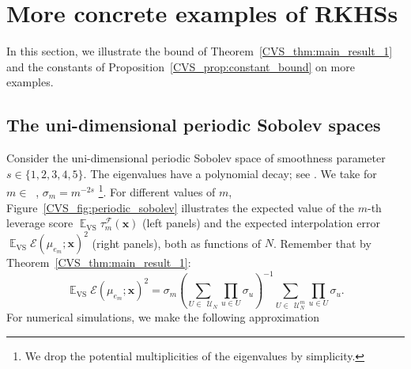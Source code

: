 \documentclass[twoside,11pt]{book}
\numberwithin{theorem}{chapter}
\numberwithin{definition}{chapter}
\numberwithin{proposition}{chapter}
\numberwithin{corollary}{chapter}
\numberwithin{example}{chapter}
\numberwithin{lemma}{chapter}
\numberwithin{assumption}{chapter}
\numberwithin{equation}{chapter}
\numberwithin{figure}{chapter}
\DeclareMathOperator{\VS}{\mathrm{VS}}
\DeclareMathOperator{\EX}{\mathbb{E}}
\DeclareMathOperator{\F}{\mathcal{F}}
\DeclareMathOperator{\X}{\mathcal{X}}
\DeclareMathOperator{\Ns}{\mathbb{N}^{*}}
\def\UN{\:\mathcal{U}_N}
\def\UNm{\:\mathcal{U}_N^m}
\begin{document}
%
\section{More concrete examples of RKHSs}
In this section, we illustrate the bound of Theorem~\ref{CVS_thm:main_result_1} and the constants of Proposition~\ref{CVS_prop:constant_bound} on more examples.
\subsection{The uni-dimensional periodic Sobolev spaces}

Consider the uni-dimensional periodic Sobolev space of smoothness parameter $s \in \{1,2,3,4,5\}$.
The eigenvalues have a polynomial decay; see \citep{Wah90}. We take for $m \in \Ns$, $\sigma_{m}=m^{-2s}$ \footnote{We drop the potential multiplicities of the eigenvalues by simplicity.}.
For different values of $m$, Figure~\ref{CVS_fig:periodic_sobolev} illustrates the expected value of the $m$-th leverage score $\EX_{\VS} \tau_{m}^{\F}(\bm{x})$ (left panels) and the expected interpolation error $\EX_{\VS} \mathcal{E}(\mu_{e_{m}};\bm{x})^{2}$ (right panels), both as functions of $N$.
Remember that by Theorem~\ref{CVS_thm:main_result_1}:
\begin{equation}
\EX_{\VS} \mathcal{E}(\mu_{e_{m}};\bm{x})^{2} = \sigma_{m} \left(\sum\limits_{ U \in \: \UN} \prod\limits_{u \in U} \sigma_{u} \right)^{-1}  \sum\limits_{U \in \: \UNm} \prod\limits_{u \in U} \sigma_{u}.
\end{equation}
For numerical simulations, we make the following approximation
\end{document}
